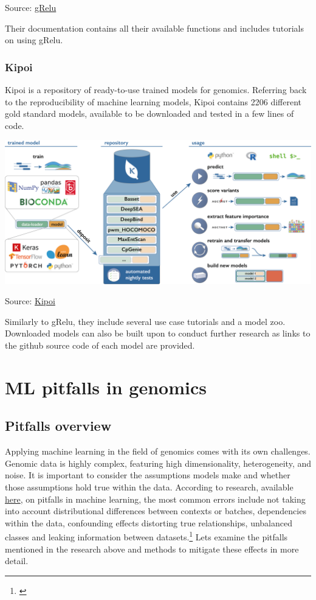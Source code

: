 \documentclass[
]{book}
\begin{document}
Source: \href{https://github.com/Genentech/gReLU/blob/main/README.md}{gRelu}

Their documentation contains all their available functions and includes tutorials on using gRelu.

\section{Kipoi}\label{kipoi}

Kipoi is a repository of ready-to-use trained models for genomics. Referring back to the reproducibility of machine learning models, Kipoi contains 2206 different gold standard models, available to be downloaded and tested in a few lines of code.

\includegraphics{images/kipoi.png}

Source: \href{https://kipoi.org/docs/}{Kipoi}

Similarly to gRelu, they include several use case tutorials and a model zoo. Downloaded models can also be built upon to conduct further research as links to the github source code of each model are provided.

\part{ML pitfalls in genomics}\label{part-ml-pitfalls-in-genomics}

\chapter{Pitfalls overview}\label{pitfalls-overview}

Applying machine learning in the field of genomics comes with its own challenges. Genomic data is highly complex, featuring high dimensionality, heterogeneity, and noise. It is important to consider the assumptions models make and whether those assumptions hold true within the data. According to research, available \href{https://www.nature.com/articles/s41576-021-00434-9}{here}, on pitfalls in machine learning, the most common errors include not taking into account distributional differences between contexts or batches, dependencies within the data, confounding effects distorting true relationships, unbalanced classes and leaking information between datasets.\footnote{\citet{whalen2022}} Lets examine the pitfalls mentioned in the research above and methods to mitigate these effects in more detail.
\end{document}
